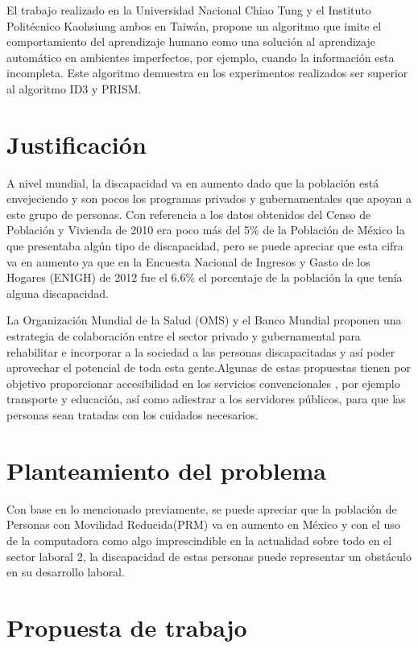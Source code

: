 El trabajo realizado en la Universidad Nacional Chiao Tung y el Instituto
 Politécnico Kaohsiung ambos en Taiwán\cite{Chang1996}, propone un algoritmo
 que imite el comportamiento del aprendizaje humano como una solución al
 aprendizaje automático en ambientes imperfectos, por ejemplo, cuando la
 información esta incompleta. Este algoritmo demuestra en los experimentos
 realizados ser superior al algoritmo ID3 y PRISM.


\section{Justificación}
A nivel mundial, la discapacidad va en aumento dado que la población está
 envejeciendo y son pocos los programas privados y gubernamentales que apoyan a
 este grupo de personas\cite{OrganizacionMundialdelaSalud2011}. 
 Con referencia a los datos obtenidos del Censo de Población
 y Vivienda de 2010 era poco más del 5\% de la Población de México la que
 presentaba algún tipo de discapacidad, pero se puede apreciar que esta cifra va
 en aumento ya que en la Encuesta Nacional de Ingresos y Gasto de los Hogares
 (ENIGH) de 2012 fue el 6.6\% el porcentaje de la población la que tenía alguna
 discapacidad\cite{Milosavljevic2014}.
 


 
La Organización Mundial de la Salud (OMS) y el Banco Mundial
\cite{OrganizacionMundialdelaSalud2011} proponen una
 estrategia de colaboración entre el sector privado y gubernamental para
 rehabilitar e incorporar a la sociedad a las personas discapacitadas y así
 poder aprovechar el potencial de toda esta gente.Algunas de estas propuestas
 tienen por objetivo proporcionar accesibilidad en los servicios convencionales
 , por ejemplo transporte y educación, así como adiestrar a los servidores
 públicos, para que las personas sean tratadas con los cuidados necesarios.
 

\section{Planteamiento del problema}
Con base en lo mencionado previamente, se puede apreciar que la población de
 Personas con Movilidad Reducida(PRM) va en aumento en México y con el uso de
 la computadora como algo imprescindible en la actualidad sobre todo en el
 sector laboral 2, la discapacidad de estas personas puede representar un
 obstáculo en su desarrollo laboral.

\section{Propuesta de trabajo}

